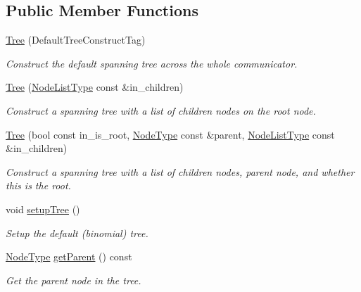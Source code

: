 \subsection*{Public Member Functions}
\begin{DoxyCompactItemize}
\item 
\hyperlink{structvt_1_1collective_1_1tree_1_1_tree_ae9570e9a8f303295744e99b527603a51}{Tree} (Default\+Tree\+Construct\+Tag)
\begin{DoxyCompactList}\small\item\em Construct the default spanning tree across the whole communicator. \end{DoxyCompactList}\item 
\hyperlink{structvt_1_1collective_1_1tree_1_1_tree_ad759f716890ce5344a6c6053fcdc7055}{Tree} (\hyperlink{structvt_1_1collective_1_1tree_1_1_tree_a834e7b54ea2dceae42db7c5ea859753f}{Node\+List\+Type} const \&in\+\_\+children)
\begin{DoxyCompactList}\small\item\em Construct a spanning tree with a list of children nodes on the root node. \end{DoxyCompactList}\item 
\hyperlink{structvt_1_1collective_1_1tree_1_1_tree_a949f8b592559125bf225bd3828bd6b88}{Tree} (bool const in\+\_\+is\+\_\+root, \hyperlink{namespacevt_a866da9d0efc19c0a1ce79e9e492f47e2}{Node\+Type} const \&parent, \hyperlink{structvt_1_1collective_1_1tree_1_1_tree_a834e7b54ea2dceae42db7c5ea859753f}{Node\+List\+Type} const \&in\+\_\+children)
\begin{DoxyCompactList}\small\item\em Construct a spanning tree with a list of children nodes, parent node, and whether this is the root. \end{DoxyCompactList}\item 
void \hyperlink{structvt_1_1collective_1_1tree_1_1_tree_aa3120d3bdbb2a308dd6831aa52d0ebb0}{setup\+Tree} ()
\begin{DoxyCompactList}\small\item\em Setup the default (binomial) tree. \end{DoxyCompactList}\item 
\hyperlink{namespacevt_a866da9d0efc19c0a1ce79e9e492f47e2}{Node\+Type} \hyperlink{structvt_1_1collective_1_1tree_1_1_tree_ab509dada696b718152e8ac04edd551af}{get\+Parent} () const
\begin{DoxyCompactList}\small\item\em Get the parent node in the tree. \end{DoxyCompactList}\item 

\end{DoxyCompactItemize}
